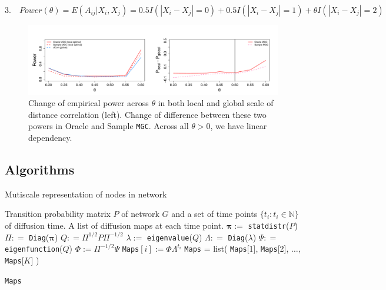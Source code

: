 \documentclass[12pt]{article}
\theoremstyle{definition}
\begin{document}
\begin{equation}
3. \quad Power(\theta) = E(A_{ij} | X_{i}, X_{j}) = 0.5 I(|X_{i} - X_{j}| = 0) + 0.5 I(|X_{i} - X_{j}| = 1) + \theta I(|X_{i} - X_{j}| = 2)
\end{equation}

\begin{figure}[H]
	\centering
	\includegraphics[width=6in]{../Figure/powerplot_monoton.pdf}
	\caption{Change of empirical power across $\theta$ in both local and global scale of distance correlation (left). Change of difference between these two powers in Oracle and Sample \texttt{MGC}. Across all $\theta > 0$, we have linear dependency.}
	\label{fig:powerplot_monoton}
\end{figure}

\newpage
\subsection{Algorithms}

\begin{algorithm}[H]
	\caption{Mutiscale representation of nodes in network}
	\begin{algorithmic}[1]
		\Require Transition probability matrix $P$ of network $G$ and a set of time points $\{ t_{i}  : t_{i} \in \mathbb{N} \}$  of diffusion time. 
		\Ensure A list of diffusion maps at each time point.
		\State $\mathbf{\pi} :=$ \texttt{statdistr}($P$) 
		\State $\Pi : =$ \texttt{Diag}($\mathbf{\pi}$)
		\State $Q: = \Pi^{1/2} P \Pi^{-1/2}$ 
		\State $\lambda := $ \texttt{eigenvalue}($Q$)
		\State $\Lambda : =$ \texttt{Diag}($\lambda$)
		\State $\Psi : =$ \texttt{eigenfunction}($Q$) 
		\State $\Phi :=  \Pi^{-1/2} \Psi$
		\Begin
		\State \texttt{Maps}$[i] := \Phi \Lambda^{t_{i}}$  
		\End
		\EndFor
		\State \texttt{Maps} = list( \texttt{Maps}[1], \texttt{Maps}[2], $\ldots$, \texttt{Maps}[$K$]  )
		
		\Return \texttt{Maps}
		\EndFunction
	\end{algorithmic}
\end{algorithm}
\end{document}
